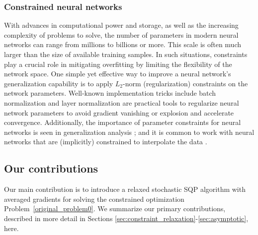 \documentclass[aos]{imsart}
\numberwithin{equation}{section}
\theoremstyle{plain}
\begin{document}
\subsubsection{Constrained neural networks}
With advances in computational power and storage, as well as the increasing complexity of problems to solve, the number of parameters in modern neural networks can range from millions to billions or more. 
This scale is often much larger than the size of available training samples. In such situations, constraints play a crucial role in mitigating overfitting by limiting the flexibility of the network space.
One simple yet effective way to improve a neural network's generalization capability is to apply $L_2$-norm (regularization) constraints on the network parameters. 
Well-known implementation tricks include batch normalization and layer normalization are practical tools to regularize neural network parameters to avoid gradient vanishing or explosion and accelerate convergence. 
Additionally, the importance of parameter constraints for neural networks is seen in generalization analysis \cite{neyshabur2017exploring}; and it is common to work with neural networks that are (implicitly) constrained to interpolate the data \cite{MonoDDGP_TR22,iic_TR}.


\subsection{Our contributions}
Our main contribution is to introduce a relaxed stochastic SQP algorithm with averaged gradients for solving the constrained optimization Problem~\eqref{original_problem0}. 
We summarize our primary contributions, described in more detail in Sections \ref{sec:constraint_relaxation}-\ref{sec:asymptotic}, here.
\end{document}
